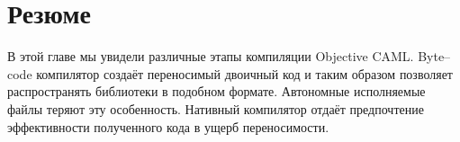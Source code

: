 \section{Резюме}
\label{sec:summary_7}

В этой главе мы увидели различные этапы компиляции Objective CAML. Byte--code
компилятор создаёт переносимый двоичный код и таким образом позволяет
распространять библиотеки в подобном формате. Автономные исполняемые файлы
теряют эту особенность. Нативный компилятор отдаёт предпочтение эффективности
полученного кода в ущерб переносимости.